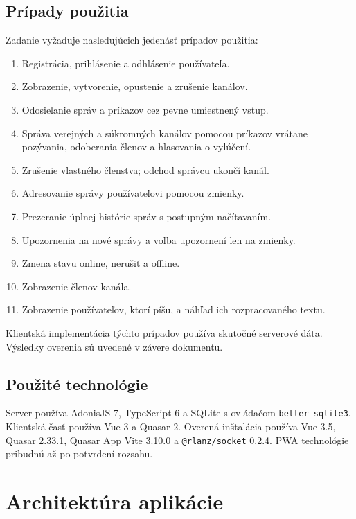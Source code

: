 \documentclass[11pt,a4paper]{article}
\begin{document}
\subsection{Prípady použitia}
Zadanie vyžaduje nasledujúcich jedenásť prípadov použitia:
\begin{enumerate}
  \item Registrácia, prihlásenie a odhlásenie používateľa.
  \item Zobrazenie, vytvorenie, opustenie a zrušenie kanálov.
  \item Odosielanie správ a príkazov cez pevne umiestnený vstup.
  \item Správa verejných a súkromných kanálov pomocou príkazov vrátane
        pozývania, odoberania členov a hlasovania o vylúčení.
  \item Zrušenie vlastného členstva; odchod správcu ukončí kanál.
  \item Adresovanie správy používateľovi pomocou zmienky.
  \item Prezeranie úplnej histórie správ s postupným načítavaním.
  \item Upozornenia na nové správy a voľba upozornení len na zmienky.
  \item Zmena stavu online, nerušiť a offline.
  \item Zobrazenie členov kanála.
  \item Zobrazenie používateľov, ktorí píšu, a náhľad ich rozpracovaného textu.
\end{enumerate}
Klientská implementácia týchto prípadov používa skutočné serverové dáta.
Výsledky overenia sú uvedené v závere dokumentu.

\subsection{Použité technológie}
Server používa AdonisJS 7, TypeScript 6 a SQLite s ovládačom
\texttt{better-sqlite3}. Klientská časť používa Vue 3 a Quasar 2.
Overená inštalácia používa Vue 3.5, Quasar 2.33.1, Quasar App Vite 3.10.0
a \texttt{@rlanz/socket} 0.2.4. PWA technológie pribudnú až po potvrdení rozsahu.

\section{Architektúra aplikácie}
\end{document}
